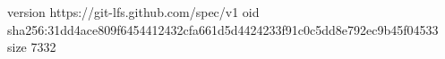 version https://git-lfs.github.com/spec/v1
oid sha256:31dd4ace809f6454412432cfa661d5d4424233f91c0c5dd8e792ec9b45f04533
size 7332
